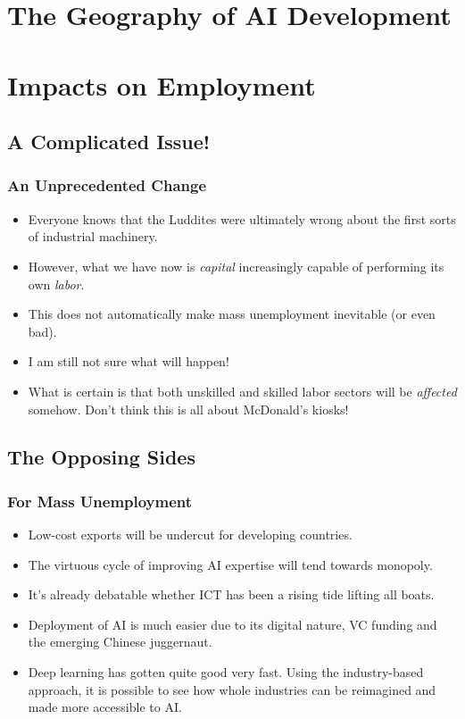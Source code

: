 \documentclass[10pt]{beamer}
\begin{document}

  \section{The Geography of AI Development}
  \section{Impacts on Employment}

  \subsection{A Complicated Issue!}

  \begin{frame}
    \frametitle{An Unprecedented Change}

    \begin{itemize}
      \item Everyone knows that the Luddites were ultimately wrong about the
        first sorts of industrial machinery.
      \pause
      \item However, what we have now is \emph{capital} increasingly capable
        of performing its own \emph{labor}.
      \pause
      \item This does not automatically make mass unemployment inevitable (or
        even bad).
      \pause
      \item I am still not sure what will happen!
      \pause
      \item What is certain is that both unskilled and skilled labor sectors
        will be \emph{affected} somehow. Don't think this is all about
        McDonald's kiosks!
    \end{itemize}
  \end{frame}

  \subsection{The Opposing Sides}

  \begin{frame}
    \frametitle{For Mass Unemployment}

    \begin{itemize}
      \item Low-cost exports will be undercut for developing countries.
      \pause
      \item The virtuous cycle of improving AI expertise will tend towards
        monopoly.
      \pause
      \item It's already debatable whether ICT has been a rising tide lifting
        all boats.
      \pause
      \item Deployment of AI is much easier due to its digital nature, VC
        funding and the emerging Chinese juggernaut.
      \pause
      \item Deep learning has gotten quite good very fast.
      \pause Using the industry-based approach, it is possible to see how
        whole industries can be reimagined and made more accessible to AI.
    \end{itemize}
  \end{frame}
\end{document}
